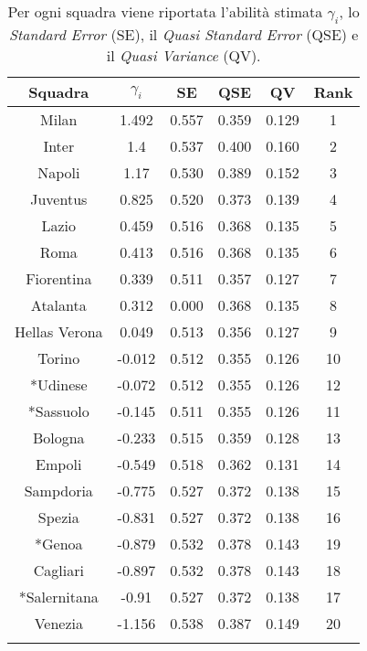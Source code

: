 	\begin{table}[!htb]%
	
	\renewcommand{\arraystretch}{1.7}
	\centering
	\begin{tabular}{c c c c c c}
		\hline	
		
		\textbf{Squadra} & \textbf{$\gamma_i$} & \textbf{SE} & \textbf{QSE} & \textbf{QV} & \textbf{Rank}   \\	
		\hline			
		Milan & 1.492 & 0.557 & 0.359 & 0.129 & 1\\
		Inter & 1.4 & 0.537 & 0.400 & 0.160 & 2\\
		Napoli & 1.17 & 0.530 & 0.389 & 0.152 & 3 \\
		Juventus & 0.825 & 0.520& 0.373& 0.139& 4\\
		Lazio & 0.459 & 0.516 & 0.368 & 0.135 & 5\\
		Roma & 0.413 & 0.516& 0.368& 0.135& 6\\
		Fiorentina & 0.339 & 0.511& 0.357& 0.127& 7\\
		Atalanta & 0.312 & 0.000 & 0.368& 0.135& 8 \\
		Hellas Verona & 0.049 & 0.513& 0.356& 0.127& 9\\
		Torino & -0.012 & 0.512 & 0.355& 0.126& 10 \\
		*Udinese & -0.072 & 0.512& 0.355 & 0.126& 12\\
		*Sassuolo & -0.145 & 0.511& 0.355 & 0.126& 11\\
		Bologna & -0.233 & 0.515& 0.359& 0.128& 13\\
		Empoli & -0.549 & 0.518& 0.362& 0.131& 14\\
		Sampdoria & -0.775 & 0.527& 0.372& 0.138& 15\\
		Spezia & -0.831 & 0.527& 0.372& 0.138& 16\\
		*Genoa & -0.879 & 0.532& 0.378& 0.143& 19 \\
		Cagliari & -0.897 & 0.532& 0.378& 0.143& 18\\
		*Salernitana & -0.91 & 0.527& 0.372& 0.138& 17\\
		Venezia & -1.156 & 0.538& 0.387& 0.149& 20\\
		\hline
		& & & & &\\
		
	\end{tabular} \hbox{}
	
	\caption{Per ogni squadra viene riportata l'abilità stimata $\gamma_i$, lo \emph{Standard 
		Error} (SE), il \emph{Quasi Standard Error} (QSE) e il \emph{Quasi Variance} (QV).} \label{tab:BTH}
\end{table}
